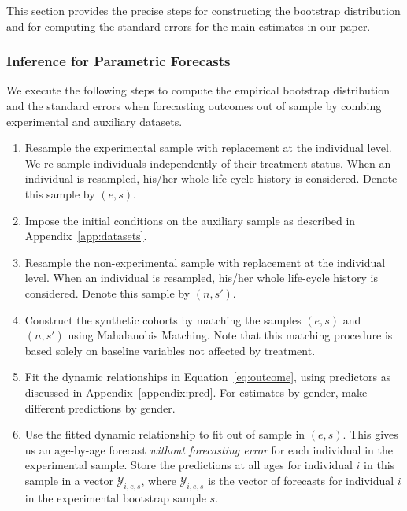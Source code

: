 \noindent This section provides the precise steps for constructing the bootstrap distribution and for computing the standard errors for the main estimates in our paper.

\subsubsection{Inference for Parametric Forecasts} \label{appendix:bootstrapspreds}

\noindent We execute the following steps to compute the empirical bootstrap distribution and the standard errors when forecasting outcomes out of sample by combing experimental and auxiliary datasets.

\begin{enumerate}
\item Resample the experimental sample with replacement at the individual level. We re-sample individuals independently of their treatment status. When an individual is resampled, his/her whole life-cycle history is considered. Denote this sample by $(e,s)$.

\item Impose the initial conditions on the auxiliary sample as described in Appendix~\ref{app:datasets}.

\item Resample the non-experimental sample with replacement at the individual level. When an individual is resampled, his/her whole life-cycle history is considered. Denote this sample by $(n,s')$.

\item Construct the synthetic cohorts by matching the samples $(e,s)$ and $(n,s')$ using Mahalanobis Matching. Note that this matching procedure is based solely on baseline variables not affected by treatment.

\item Fit the dynamic relationships in Equation~\eqref{eq:outcome}, using predictors as discussed in Appendix~\ref{appendix:pred}. For estimates by gender, make different predictions by gender.

\item Use the fitted dynamic relationship to fit out of sample in $(e,s)$. This gives us an age-by-age forecast \textit{without forecasting error} for each individual in the experimental sample. Store the predictions at all ages for individual $i$ in this sample in a vector $\mathcal{Y}_{i,e,s}$, where $\mathcal{Y}_{i,e,s}$ is the vector of forecasts for individual $i$ in the experimental bootstrap sample $s$.


\end{enumerate}
